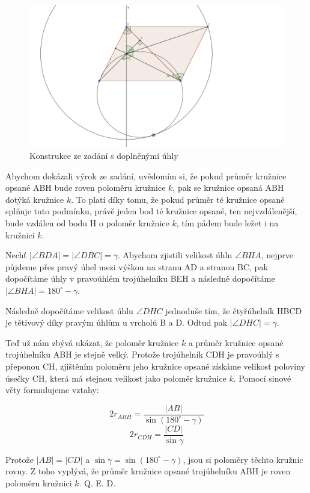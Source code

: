 \documentclass{fkssolpub}
\author{Ondřej Sedláček}
\begin{document}
 

\begin{figure}[h!]
  \centering
  \includegraphics{5-fig.png}
  \caption{Konstrukce ze zadání s doplněnými úhly}
\end{figure}

Abychom dokázali výrok ze zadání, uvědomím si, že pokud průměr kružnice opsané ABH
bude roven poloměru kružnice $k$, pak se kružnice opsaná ABH dotýká kružnice $k$. 
To platí díky tomu, že pokud průměr
té kružnice opsané splňuje tuto podmínku, právě jeden bod té kružnice opsané,
ten nejvzdálenější, bude vzdálen od bodu H o poloměr kružnice $k$, tím pádem bude
ležet i na kružnici $k$.

Nechť $|\angle BDA| = |\angle DBC| = \gamma$. Abychom zjistili velikost úhlu $\angle
BHA$, nejprve půjdeme přes pravý úhel mezi výškou na stranu AD a stranou BC, pak
dopočítáme úhly v pravoúhlém trojúhelníku BEH a následně dopočítáme $|\angle BHA|
= 180^{\circ} - \gamma$.

Následně dopočítáme velikost úhlu $\angle DHC$ jednoduše tím, že čtyřúhelník
HBCD je tětivový díky pravým úhlům u vrcholů B a D. Odtud pak $|\angle DHC| = \gamma$.

Teď už nám zbývá ukázat, že poloměr kružnice $k$ a průměr kružnice opsané
trojúhelníku ABH je stejně velký. Protože trojúhelník CDH je pravoúhlý s
přeponou CH, zjištěním poloměru jeho kružnice opsané získáme velikost poloviny
úsečky CH, která má stejnou velikost jako poloměr kružnice $k$. Pomocí sinové
věty formulujeme vztahy:

\[
  2r_{ABH} = \frac{|AB|}{\sin (180^{\circ} - \gamma)}
\]
\[
  2r_{CDH} = \frac{|CD|}{\sin \gamma}
\]

Protože $|AB| = |CD|$ a $\sin \gamma = \sin (180^{\circ} - \gamma)$, jsou si poloměry
těchto kružnic rovny. Z toho vyplývá, že průměr kružnice opsané trojúhelníku ABH je
roven poloměru kružnici $k$. Q. E. D.
\end{document}
